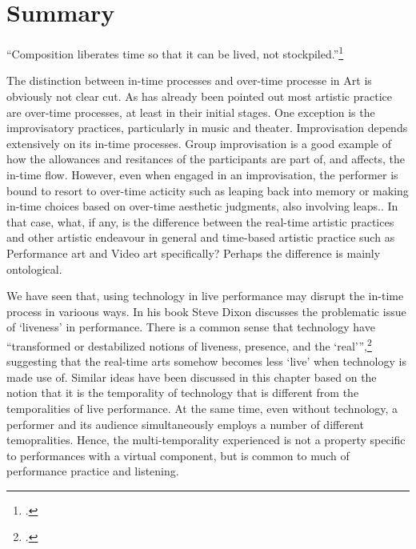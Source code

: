 
\section*{Summary}
\label{sec:summary}

``Composition liberates time so that it can be lived, not stockpiled.''\footcite[][145]{attali85}

The distinction between in-time processes and over-time processe in Art is obviously not clear cut. As has already been pointed out most artistic practice are over-time processes, at least in their initial stages. One exception is the improvisatory practices, particularly in music and theater. Improvisation depends extensively on its in-time processes. Group improvisation is a good example of how the allowances and resitances of the participants are part of, and affects, the in-time flow. However, even when engaged in an improvisation, the performer is bound to resort to over-time acticity such as leaping back into memory or making in-time choices based on over-time aesthetic judgments, also involving leaps.. In that case, what, if any, is the difference between the real-time artistic practices and other artistic endeavour in general and time-based artistic practice such as Performance art and Video art specifically? Perhaps the difference is mainly ontological.

We have seen that, using technology in live performance may disrupt the in-time process in varioous ways. In his book  Steve Dixon discusses the problematic issue of `liveness' in performance. There is a common sense that technology have ``transformed or destabilized notions of liveness, presence, and the `real''',\footcite[127]{dixon07} suggesting that the real-time arts somehow becomes less `live' when technology is made use of. Similar ideas have been discussed in this chapter based on the notion that it is the temporality of technology that is different from the temporalities of live performance. At the same time, even without technology, a performer and its audience simultaneously employs a number of different temopralities. Hence, the multi-temporality experienced is not a property specific to performances with a virtual component, but is common to much of performance practice and listening.

